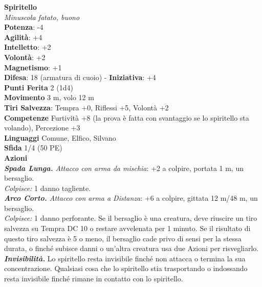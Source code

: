 \begin{multicols}{2}
\medskip\textbf{Spiritello}\\
\emph{Minuscola fatato, buono}\\
\textbf{Potenza}: -4\\
\textbf{Agilità}: +4\\
\textbf{Intelletto}: +2\\
\textbf{Volontà}: +2\\
\textbf{Magnetismo}: +1\\
\textbf{Difesa}: 18 (armatura di cuoio) - \textbf{Iniziativa}: +4\\
\textbf{Punti Ferita} 2 (1d4)\\
\textbf{Movimento} 3 m, volo 12 m\\
\textbf{Tiri Salvezza}: Tempra +0, Riflessi +5, Volontà +2\\
\textbf{Competenze} Furtività +8 (la prova è fatta con svantaggio se lo spiritello sta volando), Percezione +3\\
\textbf{Linguaggi} Comune, Elfico, Silvano\\
\textbf{Sfida} 1/4 (50 PE)\smallskip\\
\smallskip\textbf{Azioni}\\
\emph{\textbf{Spada Lunga.} Attacco con arma da mischia}: +2 a colpire, portata 1 m, un bersaglio.\\
\emph{Colpisce:} 1 danno tagliente.\\
\emph{\textbf{Arco Corto.} Attacco con arma a Distanza}: +6 a colpire, gittata 12 m/48 m, un bersaglio.\\

\emph{Colpisce:} 1 danno perforante. Se il bersaglio è una creatura, deve riuscire un tiro salvezza su Tempra DC 10 o restare avvelenata per 1 minuto. Se il risultato di questo tiro salvezza è 5 o meno, il bersaglio cade privo di sensi per la stessa durata, o finché subisce danni o un'altra creatura usa due Azioni per risvegliarlo.\\

\emph{\textbf{Invisibilità.}} Lo spiritello resta invisibile finché non attacca o termina la sua concentrazione. Qualsiasi cosa che lo spiritello stia trasportando o indossando resta invisibile finché rimane in contatto con lo spiritello.\\


\end{multicols}

